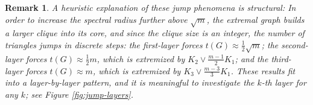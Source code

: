 \documentclass[10pt,a4paper]{amsart}
\newtheorem{remark}{Remark}
\begin{document}
 \begin{remark} 
A heuristic explanation of these jump phenomena is structural:  
In order to increase the spectral radius 
further above $\sqrt{m}$, 
the extremal graph builds a larger clique into its core, 
and since the clique size is an integer, the number of triangles jumps in discrete steps: the first-layer forces $t(G)\approx \tfrac{1}{2}\sqrt{m}$; the second-layer forces $t(G)\approx \tfrac{1}{2}m$, which is extremized by $K_2\vee \tfrac{m-1}{2}K_1$; and the third-layer forces $t(G)\approx m$, which is extremized by $K_3\vee \tfrac{m-3}{3}K_1$. These results fit into a  layer-by-layer pattern, and   
it is meaningful to investigate the $k$-th 
layer for any $k$; see Figure \ref{fig:jump-layers}.  
 \end{remark}
 
 
 \vspace{-4mm}
\end{document}
